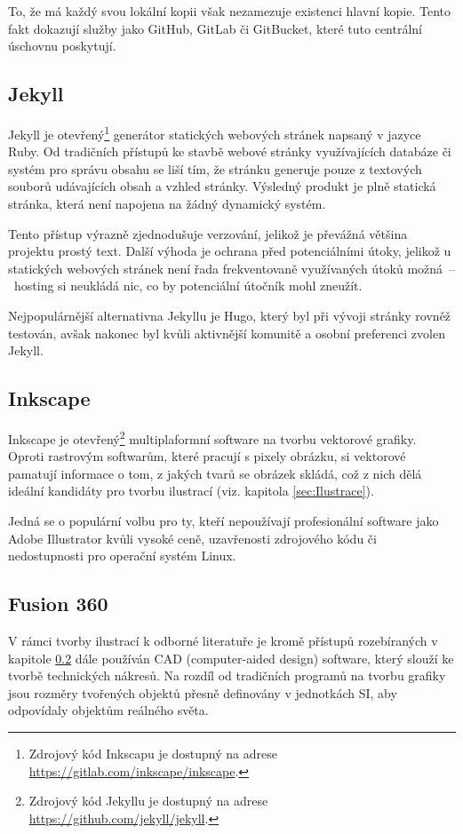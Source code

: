 \documentclass[a4paper, 12pt]{article}
\begin{document}
  To, že má každý svou lokální kopii však nezamezuje existenci hlavní kopie. Tento fakt dokazují služby jako GitHub, GitLab či GitBucket, které tuto centrální úschovnu poskytují. %


  \subsection{Jekyll} \label{sec:Jekyll}
  Jekyll je otevřený\footnote{Zdrojový kód Inkscapu je dostupný na adrese \url{https://gitlab.com/inkscape/inkscape}.} generátor statických webových stránek napsaný v jazyce Ruby. Od tradičních přístupů ke stavbě webové stránky využívajících databáze či systém pro správu obsahu se liší tím, že stránku generuje pouze z textových souborů udávajících obsah a vzhled stránky. Výsledný produkt je plně statická stránka, která není napojena na žádný dynamický systém.

  Tento přístup výrazně zjednodušuje verzování, jelikož je převážná většina projektu prostý text. Další výhoda je ochrana před potenciálními útoky, jelikož u statických webových stránek není řada frekventovaně využívaných útoků možná~--~hosting si neukládá nic, co by potenciální útočník mohl zneužít.

  Nejpopulárnější alternativna Jekyllu je Hugo, který byl při vývoji stránky rovněž testován, avšak nakonec byl kvůli aktivnější komunitě a osobní preferenci zvolen Jekyll.


  \subsection{Inkscape} \label{sec:Inkscape}
  Inkscape je otevřený\footnote{Zdrojový kód Jekyllu je dostupný na adrese \url{https://github.com/jekyll/jekyll}.} multiplaformní software na tvorbu vektorové grafiky. Oproti rastrovým softwarům, které pracují s  pixely obrázku, si vektorové pamatují informace o tom, z jakých tvarů se obrázek skládá, což z nich dělá ideální kandidáty pro tvorbu ilustrací (viz. kapitola \ref{sec:Ilustrace}).

  Jedná se o populární volbu pro ty, kteří nepoužívají profesionální software jako Adobe Illustrator kvůli vysoké ceně, uzavřenosti zdrojového kódu či nedostupnosti pro operační systém Linux.


  \subsection{Fusion 360} \label{sec:Fusion 360}
  V rámci tvorby ilustrací k odborné literatuře je kromě přístupů rozebíraných v kapitole \ref{sec:Inkscape} dále používán CAD (computer-aided design) software, který slouží ke tvorbě technických nákresů. Na rozdíl od tradičních programů na tvorbu grafiky jsou rozměry tvořených objektů přesně definovány v jednotkách SI, aby odpovídaly objektům reálného světa.
\end{document}
